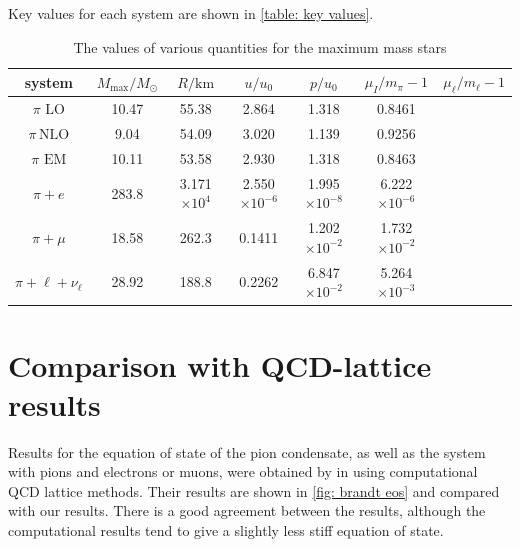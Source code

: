 Key values for each system are shown in \autoref{table: key values}.


\begin{table}[!htb]
    \centering
    \caption{The values of various quantities for the maximum mass stars}
    \label{table: key values}
    \begin{tabular}{c  c  c  c  c c c}
        \hline \hline
        system & $M_\text{max}/M_\odot$ & $R / \text{km}$ & 
        $u/u_0$ & $p/u_0$ & $\mu_I/m_\pi-1$ & $\mu_\ell/m_\ell-1$ \\
        \hline
        $\pi\,\, \text{LO}$& 10.47 & 55.38 & 2.864 & 1.318 & 0.8461& \\
        $\pi\, \text{NLO}$& 9.04 & 54.09 & 3.020 & 1.139 & 0.9256 & \\
        $\pi\,\,\text{EM}$& 10.11 & 53.58 & 2.930 & 1.318 & 0.8463 & \\
        $\pi + e$& 283.8 & 3.171$\times10^4$ & 
        2.550$\times10^{-6}$ & 1.995$\times10^{-8}$ & 
        6.222$\times10^{-6}$ & \\
        $\pi + \mu$& 18.58 & 262.3 & 
        0.1411 & 1.202$\times 10^{-2}$ &
        1.732$\times10^{-2}$& \\
        $\pi + \ell + \nu_\ell$& 28.92 & 188.8 &
        0.2262  & 6.847$\times 10^{-2}$ &
        5.264$\times10^{-3}$& \\
        \hline
    \end{tabular}
\end{table}



\section{Comparison with QCD-lattice results}

Results for the equation of state of the pion condensate, as well as the system with pions and electrons or muons, were obtained by \citeauthor{brandtNewClassCompact2018} in \autocite{brandtNewClassCompact2018} using computational QCD lattice methods.
Their results are shown in \autoref{fig: brandt eos} and compared with our results.
There is a good agreement between the results, although the computational results tend to give a slightly less stiff equation of state.

